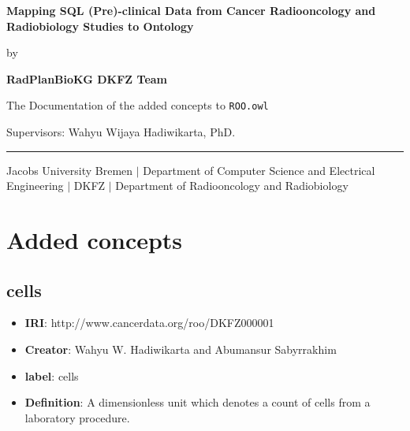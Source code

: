 \documentclass[a4paper,12pt,oneside]{article}
\newcommand{\mylastname}{DKFZ Team}
\newcommand{\myfirstname}{RadPlanBioKG}
\newcommand{\myname}{\myfirstname{} \mylastname{}}
\newcommand{\mytitle}{Mapping SQL (Pre)-clinical Data from Cancer Radiooncology and
Radiobiology Studies to Ontology}
\newcommand{\mysupervisor}{Wahyu Wijaya Hadiwikarta, PhD.}
\begin{document}

  \thispagestyle{empty}

  \vspace*{40mm}
  \begin{center}
    \huge
    \textbf{\mytitle}
  \end{center}
  \vspace*{4mm}
  \begin{center}
   \Large by
  \end{center}
  \vspace*{4mm}
  \begin{center}
    \LARGE
    \textbf{\myname}
  \end{center}
  \vspace*{20mm}
  \begin{center}
    \Large
    The Documentation of the added concepts to \texttt{ROO.owl}
  \end{center}
  \vfill
  \begin{flushleft}
    \large
    Supervisors: \mysupervisor \\
    \rule{\textwidth}{1pt}
  \end{flushleft}
  \begin{center}
    Jacobs University Bremen $|$ Department of Computer Science and Electrical Engineering $|$ 
    DKFZ $|$ Department of Radiooncology and Radiobiology
  \end{center}

  \newpage
  \thispagestyle{empty}
  
  \newpage
  \tableofcontents

  \clearpage

  \section{Added concepts}

  \subsection{cells}

   \begin{itemize}
      \item \textbf{IRI}: http://www.cancerdata.org/roo/DKFZ000001
      \item \textbf{Creator}: Wahyu W. Hadiwikarta and Abumansur Sabyrrakhim
      \item \textbf{label}: cells
      \item \textbf{Definition}: A dimensionless unit which denotes a count of cells from a laboratory procedure.
  \end{itemize}  
\end{document}
